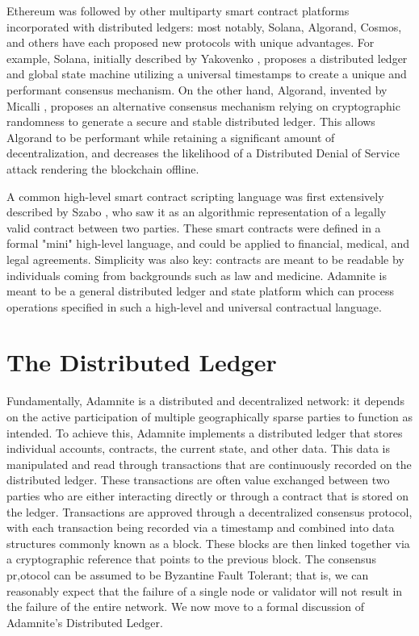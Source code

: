 \documentclass[conference]{IEEEtran}
\begin{document}
Ethereum was followed by other multiparty smart contract platforms incorporated with distributed ledgers: most notably, Solana, Algorand, Cosmos, and others have each proposed new protocols with unique advantages. For example, Solana, initially described by Yakovenko \cite {Yakovenko}, proposes a distributed ledger and global state machine utilizing a universal timestamps to create a unique and performant consensus mechanism. On the other hand, Algorand, invented by
Micalli \cite{micalli2017Algroand}, proposes an alternative consensus mechanism relying on cryptographic randomness to generate a secure and stable distributed ledger. This allows Algorand to be performant while retaining a significant amount of decentralization, and decreases the likelihood of a Distributed Denial of Service attack rendering the blockchain offline.

A common high-level smart contract scripting language was first extensively described by Szabo \cite{szaboContract}, who saw it as an algorithmic representation of a legally valid contract between two parties. These smart contracts were defined in a formal "mini" high-level language, and could be applied to financial, medical, and legal agreements. Simplicity was also key: contracts are meant to be readable by individuals coming from backgrounds such as law and medicine. Adamnite is meant to be a general distributed ledger and state platform which can process operations specified in such a high-level and universal contractual language.


\section{The Distributed Ledger}
Fundamentally, Adamnite is a distributed and decentralized network: it depends on the active participation of multiple geographically sparse parties to function as intended. To achieve this, Adamnite implements a distributed ledger that stores individual accounts, contracts, the current state, and other data. This data is manipulated and read through transactions that are continuously recorded on the distributed ledger. These transactions are often value exchanged between two parties who are either interacting directly or through a contract that is stored on the ledger. Transactions are approved through a decentralized consensus protocol, with each transaction being recorded via a timestamp and combined into data structures commonly known as a block. These blocks are then linked together via a cryptographic reference that points to the previous block.  The consensus pr,otocol can be assumed to be Byzantine Fault Tolerant; that is, we can reasonably expect that the failure of a single node or validator will not result in the failure of the entire network. We now move to a formal discussion of Adamnite's Distributed Ledger.
\end{document}
